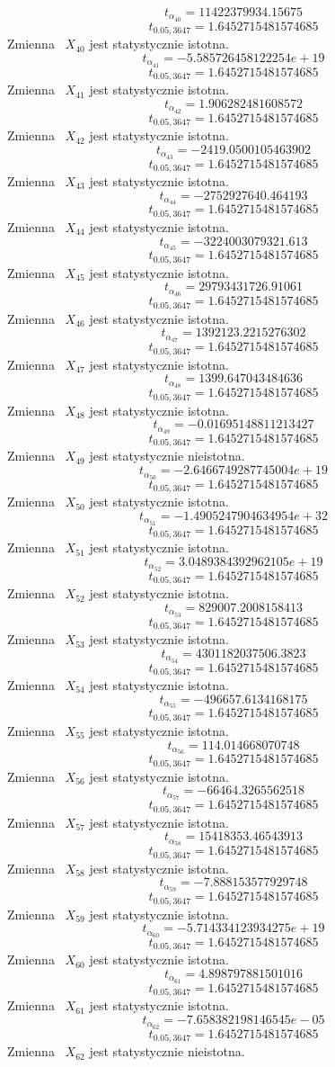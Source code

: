 \documentclass{article}
\begin{document}
\[t_{\alpha_{40}} = 11422379934.15675\]
\[t_{0.05, 3647} = 1.6452715481574685\]
Zmienna ~$X_{40}$ jest statystycznie istotna.
\[t_{\alpha_{41}} = -5.585726458122254e+19\]
\[t_{0.05, 3647} = 1.6452715481574685\]
Zmienna ~$X_{41}$ jest statystycznie istotna.
\[t_{\alpha_{42}} = 1.906282481608572\]
\[t_{0.05, 3647} = 1.6452715481574685\]
Zmienna ~$X_{42}$ jest statystycznie istotna.
\[t_{\alpha_{43}} = -2419.0500105463902\]
\[t_{0.05, 3647} = 1.6452715481574685\]
Zmienna ~$X_{43}$ jest statystycznie istotna.
\[t_{\alpha_{44}} = -2752927640.464193\]
\[t_{0.05, 3647} = 1.6452715481574685\]
Zmienna ~$X_{44}$ jest statystycznie istotna.
\[t_{\alpha_{45}} = -3224003079321.613\]
\[t_{0.05, 3647} = 1.6452715481574685\]
Zmienna ~$X_{45}$ jest statystycznie istotna.
\[t_{\alpha_{46}} = 29793431726.91061\]
\[t_{0.05, 3647} = 1.6452715481574685\]
Zmienna ~$X_{46}$ jest statystycznie istotna.
\[t_{\alpha_{47}} = 1392123.2215276302\]
\[t_{0.05, 3647} = 1.6452715481574685\]
Zmienna ~$X_{47}$ jest statystycznie istotna.
\[t_{\alpha_{48}} = 1399.647043484636\]
\[t_{0.05, 3647} = 1.6452715481574685\]
Zmienna ~$X_{48}$ jest statystycznie istotna.
\[t_{\alpha_{49}} = -0.01695148811213427\]
\[t_{0.05, 3647} = 1.6452715481574685\]
Zmienna ~$X_{49}$ jest statystycznie nieistotna.
\[t_{\alpha_{50}} = -2.6466749287745004e+19\]
\[t_{0.05, 3647} = 1.6452715481574685\]
Zmienna ~$X_{50}$ jest statystycznie istotna.
\[t_{\alpha_{51}} = -1.4905247904634954e+32\]
\[t_{0.05, 3647} = 1.6452715481574685\]
Zmienna ~$X_{51}$ jest statystycznie istotna.
\[t_{\alpha_{52}} = 3.0489384392962105e+19\]
\[t_{0.05, 3647} = 1.6452715481574685\]
Zmienna ~$X_{52}$ jest statystycznie istotna.
\[t_{\alpha_{53}} = 829007.2008158413\]
\[t_{0.05, 3647} = 1.6452715481574685\]
Zmienna ~$X_{53}$ jest statystycznie istotna.
\[t_{\alpha_{54}} = 4301182037506.3823\]
\[t_{0.05, 3647} = 1.6452715481574685\]
Zmienna ~$X_{54}$ jest statystycznie istotna.
\[t_{\alpha_{55}} = -496657.6134168175\]
\[t_{0.05, 3647} = 1.6452715481574685\]
Zmienna ~$X_{55}$ jest statystycznie istotna.
\[t_{\alpha_{56}} = 114.014668070748\]
\[t_{0.05, 3647} = 1.6452715481574685\]
Zmienna ~$X_{56}$ jest statystycznie istotna.
\[t_{\alpha_{57}} = -66464.3265562518\]
\[t_{0.05, 3647} = 1.6452715481574685\]
Zmienna ~$X_{57}$ jest statystycznie istotna.
\[t_{\alpha_{58}} = 15418353.46543913\]
\[t_{0.05, 3647} = 1.6452715481574685\]
Zmienna ~$X_{58}$ jest statystycznie istotna.
\[t_{\alpha_{59}} = -7.888153577929748\]
\[t_{0.05, 3647} = 1.6452715481574685\]
Zmienna ~$X_{59}$ jest statystycznie istotna.
\[t_{\alpha_{60}} = -5.714334123934275e+19\]
\[t_{0.05, 3647} = 1.6452715481574685\]
Zmienna ~$X_{60}$ jest statystycznie istotna.
\[t_{\alpha_{61}} = 4.898797881501016\]
\[t_{0.05, 3647} = 1.6452715481574685\]
Zmienna ~$X_{61}$ jest statystycznie istotna.
\[t_{\alpha_{62}} = -7.658382198146545e-05\]
\[t_{0.05, 3647} = 1.6452715481574685\]
Zmienna ~$X_{62}$ jest statystycznie nieistotna.
\end{document}
